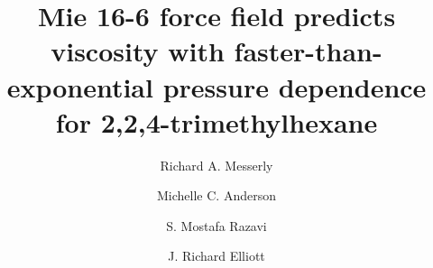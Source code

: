 \documentclass[preprint,review,12pt]{elsarticle}
\begin{document}
	
	\begin{frontmatter}
		
		
		
        \title{Mie 16-6 force field predicts viscosity with faster-than-exponential pressure dependence for 2,2,4-trimethylhexane}
				
		
		\author{Richard A. Messerly}
		\address{Thermodynamics Research Center, National Institute of Standards and Technology, Boulder, Colorado, 80305}
		
		\author{Michelle C. Anderson}
		\address{Thermodynamics Research Center, National Institute of Standards and Technology, Boulder, Colorado, 80305}
		
		\author{S. Mostafa Razavi}
		\address{Department of Chemical and Biomolecular Engineering, The University of Akron, Akron, Ohio, 44325-3906}
		
		\author{J. Richard Elliott}
		\address{Department of Chemical and Biomolecular Engineering, The University of Akron, Akron, Ohio, 44325-3906}
		

\end{frontmatter}
\end{document}
